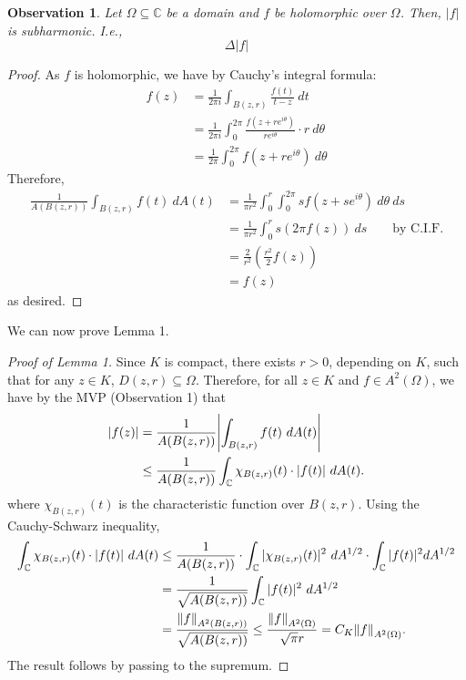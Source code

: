 \documentclass[10pt]{article}
\theoremstyle{plain}
\newtheorem{observation}{Observation}
\begin{document}
	\newpage 
	\begin{observation}
		Let $\Omega \subseteq \mathbb{C}$ be a domain and $f$ be holomorphic over $\Omega$. Then, $|f|$ is subharmonic. I.e., $$\Delta |f| $$
	\end{observation}
		\begin{proof}
			As $f$ is holomorphic, we have by Cauchy's integral formula:
				\begin{align*}
					f(z) &= \frac{1}{2 \pi i} \int_{B(z, r)} \frac{f(t)}{t - z} \ dt \\
					&= \frac{1}{2 \pi i} \int_{0}^{2\pi} \frac{f(z + re^{i \theta})}{re^{i \theta}} \cdot r \ d\theta \\
					&= \frac{1}{2 \pi} \int_{0}^{2 \pi} f(z + re^{i \theta})  \ d \theta 
				\end{align*}
			Therefore,
				\begin{align*}
					\frac{1}{A(B(z, r))} \int_{B(z, r)} f(t) \ dA(t) &= \frac{1}{\pi r^2} \int_0^{r} \int_{0}^{2 \pi} s f(z + se^{i \theta}) \ d \theta \ ds \\
					&= \frac{1}{\pi r^2} \int_{0}^r s (2 \pi f(z)) \ ds \qquad \text{by C.I.F.} \\
					&= \frac{2}{r^2} \left(\frac{r^2}{2} f(z)\right) \\
					&= f(z)
				\end{align*}
			as desired.
		\end{proof}
	
	\noindent We can now prove Lemma 1.
		\begin{proof}[Proof of Lemma 1]
			Since $K$ is compact, there exists $r > 0$, depending on $K$, such that for any $z \in K$, $D(z, r) \subseteq \Omega$. Therefore, for all $z \in K$ and $f \in A^2(\Omega)$, we have by the MVP (Observation 1) that
				\begin{align*}
					\abs{f(z)} &= \frac{1}{A(B(z, r))}\abs{\int_{B(z, r)} f(t) \ dA(t)} \\
					&\leq \frac{1}{A(B(z, r))} \int_{\mathbb{C}} \chi_{B(z, r)}(t) \cdot |f(t)| \ dA(t).
				\end{align*}
			where $\chi_{B(z, r)}(t)$ is the characteristic function over $B(z, r)$. Using the Cauchy-Schwarz inequality, 
				\begin{align*}
					\int_{\mathbb{C}} \chi_{B(z, r)}(t) \cdot |f(t)| \ dA(t) &\leq \frac{1}{A(B(z, r))} \cdot \int_{\mathbb{C}} |\chi_{B(z, r)}(t)|^2 \ dA^{1/2} \cdot \int_{\mathbb{C}} |f(t)|^2 dA^{1/2} \\
					&= \frac{1}{\sqrt{A(B(z, r))}} \int_{\mathbb{C}} |f(t)|^2 \ dA^{1/2} \\
					&= \frac{\norm{f}_{A^2(B(z, r))}}{\sqrt{A(B(z, r))}} \leq \frac{\norm{f}_{A^2(\Omega)}}{\sqrt{\pi}r} = C_K \norm{f}_{A^2(\Omega)}.
				\end{align*}
			The result follows by passing to the supremum. 
		\end{proof}
	
\end{document}
